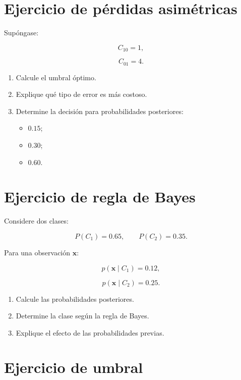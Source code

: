 \documentclass[
  spanish,
  11pt,
  letterpaper,
  DIV=11,
  numbers=noendperiod]{scrreprt}
\providecommand{\tightlist}{%
  \setlength{\itemsep}{0pt}\setlength{\parskip}{0pt}}
\theoremstyle{definition}
\theoremstyle{plain}
\theoremstyle{definition}
\theoremstyle{remark}
\begin{document}
\section{Ejercicio de pérdidas
asimétricas}\label{ejercicio-de-puxe9rdidas-asimuxe9tricas}

Supóngase:

\[
C_{10}=1,
\]

\[
C_{01}=4.
\]

\begin{enumerate}
\def\labelenumi{\arabic{enumi}.}
\tightlist
\item
  Calcule el umbral óptimo.
\item
  Explique qué tipo de error es más costoso.
\item
  Determine la decisión para probabilidades posteriores:

  \begin{itemize}
  \tightlist
  \item
    \(0.15\);
  \item
    \(0.30\);
  \item
    \(0.60\).
  \end{itemize}
\end{enumerate}

\section{Ejercicio de regla de Bayes}\label{ejercicio-de-regla-de-bayes}

Considere dos clases:

\[
P(C_1)=0.65,
\qquad
P(C_2)=0.35.
\]

Para una observación \(\mathbf{x}\):

\[
p(\mathbf{x}\mid C_1)=0.12,
\]

\[
p(\mathbf{x}\mid C_2)=0.25.
\]

\begin{enumerate}
\def\labelenumi{\arabic{enumi}.}
\tightlist
\item
  Calcule las probabilidades posteriores.
\item
  Determine la clase según la regla de Bayes.
\item
  Explique el efecto de las probabilidades previas.
\end{enumerate}

\section{Ejercicio de umbral}\label{ejercicio-de-umbral}
\end{document}
